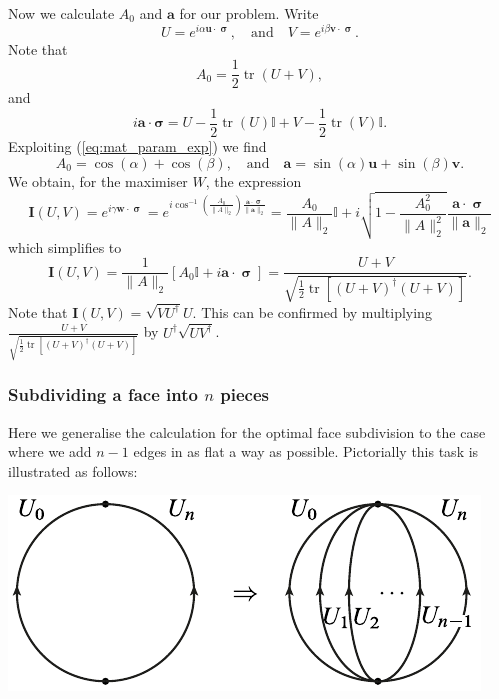 \documentclass[12pt]{amsart}
\DeclareMathOperator{\paulivec}{\boldsymbol{\sigma}}
\newcommand{\tr}{\operatorname{tr}}
\theoremstyle{definition}
\theoremstyle{remark}
\numberwithin{equation}{section}
\begin{document}
Now we calculate $A_0$ and $\mathbf{a}$ for our problem. Write
\begin{equation}
	U = e^{i\alpha \mathbf{u}\cdot \paulivec}, \quad \text{and} \quad V = e^{i\beta \mathbf{v}\cdot \paulivec}.
\end{equation}
Note that 
\begin{equation}
	A_0 = \frac12 \tr(U+V),
\end{equation}
and
\begin{equation}
	i\mathbf{a}\cdot\boldsymbol{\sigma} = U-\frac12\tr(U)\mathbb{I} + V-\frac12\tr(V)\mathbb{I}.
\end{equation}
Exploiting (\ref{eq:mat_param_exp}) we find
\begin{equation}
	A_0 = \cos(\alpha) + \cos(\beta), \quad \text{and}\quad \mathbf{a} = \sin(\alpha)\mathbf{u} + \sin(\beta)\mathbf{v}.
\end{equation}
We obtain, for the maximiser $W$, the expression
\begin{equation}
	\mathbf{I}(U,V) = e^{i\gamma \mathbf{w}\cdot \paulivec} = e^{i\cos^{-1}\left(\frac{A_0}{\|A\|_2}\right) \frac{\mathbf{a}\cdot\paulivec}{\|\mathbf{a}\|_2}} = \frac{A_0}{\|A\|_2}\mathbb{I} + i\sqrt{1-\frac{A_0^2}{\|A\|_2^2}}\frac{\mathbf{a}\cdot\paulivec}{\|\mathbf{a}\|_2}
\end{equation}
which simplifies to
\begin{equation}
	\mathbf{I}(U,V) = \frac{1}{\|A\|_2}\left[ A_0\mathbb{I} + i\mathbf{a}\cdot\paulivec \right]
	 = \frac{U+V}{\sqrt{\frac12\tr[(U+V)^\dag(U+V)]}}.
\end{equation}
Note that $\mathbf{I}(U,V) = \sqrt{VU^\dag} U$. This can be confirmed by multiplying $\frac{U+V}{\sqrt{\frac12\tr[(U+V)^\dag(U+V)]}}$ by $U^\dag \sqrt{UV^\dag}$.

\subsubsection{Subdividing a face into $n$ pieces}
Here we generalise the calculation for the optimal face subdivision to the case where we add $n-1$ edges in as flat a way as possible. Pictorially this task is illustrated as follows:

\begin{center}
	\includegraphics{facemsection.pdf}
\end{center}
\end{document}
